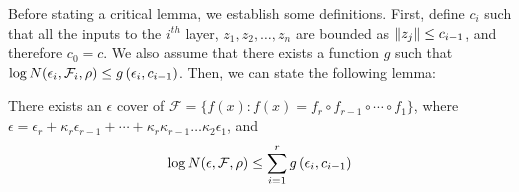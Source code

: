 Before stating a critical lemma, we establish some definitions. First, define $c_i$ such that all the inputs to the $i^{th}$ layer, $z_1, z_2, \dots, z_n$ are bounded as $\|z_j\| \leq c_{i-1}$, and therefore $c_0 = c$. We also assume that there exists a function $g$ such that $\log N (\epsilon_i, \mathcal F_i, \rho) \leq g\left(\epsilon_i, c_{i-1}\right)$. Then, we can state the following lemma:

\begin{lemma}
    There exists an $\epsilon$ cover of $\mathcal{F} = \{f(x) : f(x) = f_r \circ f_{r-1} \circ \cdots \circ f_1\}$, where $\epsilon = \epsilon_r + \kappa_r\epsilon_{r-1} + \cdots + \kappa_r\kappa_{r-1}\dots\kappa_2\epsilon_1$, and
    \begin{align}
    \log N(\epsilon, \mathcal F, \rho) \leq \sum_{i=1}^{r} g\left(\epsilon_i, c_{i-1}\right)
    \end{align}
    \label{lec10:lma:additive_cover}
\end{lemma}

